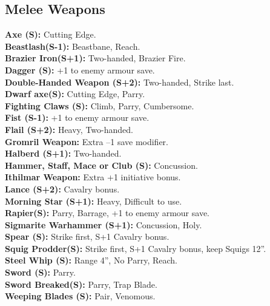 \subsection*{Melee Weapons}
{\small \textbf{Axe (S):} Cutting Edge. \\
\textbf{Beastlash(S-1):} Beastbane, Reach. \\
\textbf{Brazier Iron(S+1):} Two-handed, Brazier Fire. \\
\textbf{Dagger (S):} +1 to enemy armour save. \\
\textbf{Double-Handed Weapon (S+2):} Two-handed, Strike last. \\
\textbf{Dwarf axe(S):} Cutting Edge, Parry. \\
\textbf{Fighting Claws (S):} Climb, Parry, Cumbersome. \\
\textbf{Fist (S-1):} +1 to enemy armour save. \\
\textbf{Flail (S+2):} Heavy, Two-handed. \\
\textbf{Gromril Weapon:} Extra –1 save modifier. \\
\textbf{Halberd (S+1):} Two-handed. \\
\textbf{Hammer, Staff, Mace or Club (S):} Concussion. \\
\textbf{Ithilmar Weapon:} Extra +1 initiative bonus. \\
\textbf{Lance (S+2):} Cavalry bonus. \\
\textbf{Morning Star (S+1):} Heavy, Difficult to use. \\
\textbf{Rapier(S):} Parry, Barrage, +1 to enemy armour save. \\
\textbf{Sigmarite Warhammer (S+1):} Concussion, Holy. \\
\textbf{Spear (S):} Strike first, S+1 Cavalry bonus. \\
\textbf{Squig Prodder(S):} Strike first, S+1 Cavalry bonus, keep Squigs 12”. \\
\textbf{Steel Whip (S):} Range 4”, No Parry, Reach. \\
\textbf{Sword (S):} Parry. \\
\textbf{Sword Breaked(S):} Parry, Trap Blade. \\
\textbf{Weeping Blades (S):} Pair, Venomous.}

